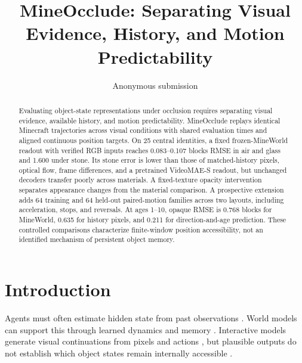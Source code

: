 \documentclass{article}
\title{MineOcclude: Separating Visual Evidence, History, and Motion Predictability}
\author{Anonymous submission}
\begin{document}
\maketitle

\begin{abstract}
Evaluating object-state representations under occlusion requires separating visual evidence, available history, and motion predictability. MineOcclude replays identical Minecraft trajectories across visual conditions with shared evaluation times and aligned continuous position targets. On 25 central identities, a fixed frozen-MineWorld readout with verified RGB inputs reaches 0.083--0.107 blocks RMSE in air and glass and 1.600 under stone. Its stone error is lower than those of matched-history pixels, optical flow, frame differences, and a pretrained VideoMAE-S readout, but unchanged decoders transfer poorly across materials. A fixed-texture opacity intervention separates appearance changes from the material comparison. A prospective extension adds 64 training and 64 held-out paired-motion families across two layouts, including acceleration, stops, and reversals. At ages 1--10, opaque RMSE is 0.768 blocks for MineWorld, 0.635 for history pixels, and 0.211 for direction-and-age prediction. These controlled comparisons characterize finite-window position accessibility, not an identified mechanism of persistent object memory.
\end{abstract}

\section{Introduction}

Agents must often estimate hidden state from past observations \citep{kaelbling1998planning,hafner2019planet,zheng2026memworld}. World models can support this through learned dynamics and memory \citep{ha2018worldmodels,hafner2020dreamer,laird2025memory}. Interactive models generate visual continuations from pixels and actions \citep{micheli2023transformers,alonso2024diffusion,bruce2024genie,decart2024oasis,guo2025mineworld}, but plausible outputs do not establish which object states remain internally accessible \citep{motamed2025generative,esmati2026invisible}.
\end{document}

